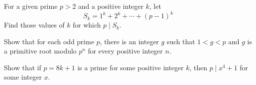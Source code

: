 \begin{problem}
	For a given prime $p > 2$ and a positive integer $k$, let \[ S_k = 1^k + 2^k + \cdots + (p - 1)^k\] Find those values of $k$ for which $p \mid S_k$. %
\end{problem}

%

\begin{problem}
	Show that for each odd prime $p$, there is an integer $g$ such that $1<g<p$ and $g$ is a primitive root modulo $p^n$ for every positive integer $n$. %
\end{problem}


\begin{problem}
	Show that if $p=8k+1$ is a prime for some positive integer $k$, then $p\mid x^4+1$ for some integer $x$. %
\end{problem}


